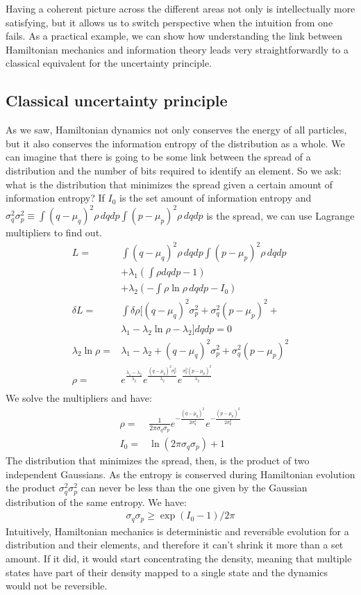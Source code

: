 \documentclass[11pt]{article}
\begin{document}
Having a coherent picture across the different areas not only is intellectually more satisfying, but it allows us to switch perspective when the intuition from one fails. As a practical example, we can show how understanding the link between Hamiltonian mechanics and information theory leads very straightforwardly to a classical equivalent for the uncertainty principle.

\subsection*{Classical uncertainty principle}

As we saw, Hamiltonian dynamics not only conserves the energy of all particles, but it also conserves the information entropy of the distribution as a whole. We can imagine that there is going to be some link between the spread of a distribution and the number of bits required to identify an element. So we ask: what is the distribution that minimizes the spread given a certain amount of information entropy? If $I_0$ is the set amount of information entropy and $\sigma_q^2 \sigma_p^2 \equiv \int (q-\mu_q)^2 \rho \, dqdp \int (p-\mu_p)^2 \rho \, dqdp$ is the spread, we can use Lagrange multipliers to find out.
\begin{align*}
L = &\int (q-\mu_q)^2 \rho \, dqdp \int (p-\mu_p)^2 \rho \, dqdp \\
&+ \lambda_1(\int \rho dqdp - 1) \\ &+ \lambda_2(- \int \rho \ln \rho \, dqdp - I_0)\\ 
\delta L = &\int \delta \rho [(q-\mu_q)^2 \sigma_p^2 + \sigma_q^2 (p-\mu_p)^2 + \\ &\lambda_1 - \lambda_2 \ln \rho - \lambda_2 ] dqdp = 0 \\
\lambda_2 \ln \rho = &\lambda_1 - \lambda_2 + (q-\mu_q)^2 \sigma_p^2 + \sigma_q^2 (p-\mu_p)^2 \\
\rho = &e^{\frac{\lambda_1 - \lambda_2}{\lambda_2}}e^{\frac{(q-\mu_q)^2 \sigma_p^2}{\lambda_2}}e^{\frac{\sigma_q^2 (p-\mu_p)^2}{\lambda_2}}\\
\end{align*}
We solve the multipliers and have:
\begin{align*}
\rho = &\frac{1}{ 2 \pi \sigma_q \sigma_p} e^{-\frac{(q-\mu_q)^2}{2\sigma_q^2}} e^{-\frac{(p-\mu_p)^2}{2\sigma_p^2}} \\
I_0 = &\ln (2\pi\sigma_q\sigma_p) + 1
\end{align*}
The distribution that minimizes the spread, then, is the product of two independent Gaussians. As the entropy is conserved during Hamiltonian evolution the product $\sigma_q^2 \sigma_p^2$ can never be less than the one given by the Gaussian distribution of the same entropy. We have:
\begin{align*}
\sigma_q\sigma_p \geq \exp (I_0 - 1) / 2 \pi 
\end{align*}
Intuitively, Hamiltonian mechanics is deterministic and reversible evolution for a distribution and their elements, and therefore it can't shrink it more than a set amount. If it did, it would start concentrating the density, meaning that multiple states have part of their density mapped to a single state and the dynamics would not be reversible.
\end{document}
